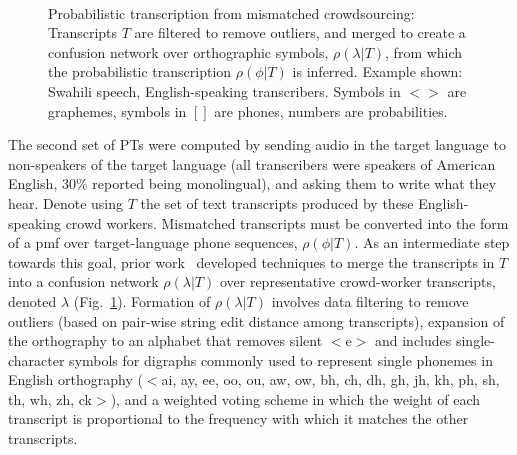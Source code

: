 \begin{figure}[b!]
\begin{center}
\\
\end{center}
\setlength{\abovecaptionskip}{0pt}
\caption{Probabilistic transcription from mismatched crowdsourcing:
  Transcripts $T$ are filtered to remove outliers, and merged to
  create a confusion network over orthographic symbols,
  $\rho(\lambda|T)$, from which the probabilistic transcription
  $\rho(\phi|T)$ is inferred. Example shown: Swahili speech,
  English-speaking transcribers.  Symbols in $<$$>$ are graphemes,
  symbols in $[]$ are phones, numbers are probabilities.}
\label{fig:mcmethods}
\end{figure}

The second set of PTs were computed by sending audio in the target
language to non-speakers of the target language (all transcribers were
speakers of American English, 30\% reported being monolingual), and
asking them to write what they hear.  Denote using $T$ the set of text
transcripts produced by these English-speaking crowd workers.
Mismatched transcripts must be converted into the form of a pmf over
target-language phone sequences, $\rho(\phi|T)$.  As an intermediate
step towards this goal, prior work~\cite{JHJ15b} developed techniques
to merge the transcripts in $T$ into a confusion network
$\rho(\lambda|T)$ over representative crowd-worker transcripts,
denoted $\lambda$ (Fig.~\ref{fig:mcmethods}).  Formation of
$\rho(\lambda|T)$ involves data filtering to remove outliers (based on
pair-wise string edit distance among transcripts), expansion of the
orthography to an alphabet that removes silent $<$e$>$ and includes
single-character symbols for digraphs commonly used to represent
single phonemes in English orthography ($<$ai, ay, ee, oo, ou, aw, ow,
bh, ch, dh, gh, jh, kh, ph, sh, th, wh, zh, ck$>$), and a weighted
voting scheme in which the weight of each transcript is proportional
to the frequency with which it matches the other transcripts.

